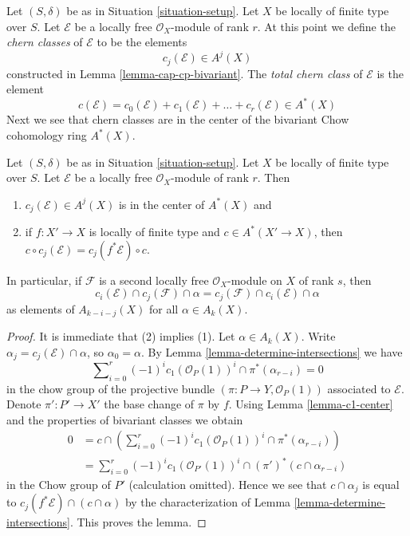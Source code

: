 \noindent
Let $(S, \delta)$ be as in Situation \ref{situation-setup}.
Let $X$ be locally of finite type over $S$.
Let $\mathcal{E}$ be a locally free $\mathcal{O}_X$-module
of rank $r$. At this point we define the {\it chern classes}
of $\mathcal{E}$ to be the elements
$$
c_j(\mathcal{E}) \in A^j(X)
$$
constructed in Lemma \ref{lemma-cap-cp-bivariant}. The
{\it total chern class} of $\mathcal{E}$ is the element
$$
c(\mathcal{E}) = 
c_0(\mathcal{E}) + c_1(\mathcal{E}) + \ldots + c_r(\mathcal{E})
\in A^*(X)
$$
Next we see that chern classes are in the center of the bivariant
Chow cohomology ring $A^*(X)$.

\begin{lemma}
\label{lemma-cap-commutative-chern}
Let $(S, \delta)$ be as in Situation \ref{situation-setup}.
Let $X$ be locally of finite type over $S$.
Let $\mathcal{E}$ be a locally free $\mathcal{O}_X$-module of rank $r$.
Then
\begin{enumerate}
\item $c_j(\mathcal{E}) \in A^j(X)$ is in the center of $A^*(X)$ and
\item if $f : X' \to X$ is locally of finite type and $c \in A^*(X' \to X)$,
then $c \circ c_j(\mathcal{E}) = c_j(f^*\mathcal{E}) \circ c$.
\end{enumerate}
In particular, if $\mathcal{F}$ is a second locally free
$\mathcal{O}_X$-module on $X$ of rank $s$, then
$$
c_i(\mathcal{E}) \cap c_j(\mathcal{F}) \cap \alpha
=
c_j(\mathcal{F}) \cap c_i(\mathcal{E}) \cap \alpha
$$
as elements of $A_{k - i - j}(X)$ for all $\alpha \in A_k(X)$.
\end{lemma}

\begin{proof}
It is immediate that (2) implies (1).
Let $\alpha \in A_k(X)$. Write $\alpha_j = c_j(\mathcal{E}) \cap \alpha$, so
$\alpha_0 = \alpha$. By Lemma \ref{lemma-determine-intersections} we have
$$
\sum\nolimits_{i = 0}^r
(-1)^i c_1(\mathcal{O}_P(1))^i \cap
\pi^*(\alpha_{r - i}) = 0
$$
in the chow group of the projective bundle
$(\pi : P \to Y, \mathcal{O}_P(1))$
associated to $\mathcal{E}$. Denote $\pi' : P' \to X'$ the base change
of $\pi$ by $f$. Using Lemma \ref{lemma-c1-center} and
the properties of bivariant classes we obtain
\begin{align*}
0 & = c \cap \left(\sum\nolimits_{i = 0}^r
(-1)^i c_1(\mathcal{O}_P(1))^i \cap
\pi^*(\alpha_{r - i})\right) \\
& =
\sum\nolimits_{i = 0}^r
(-1)^i c_1(\mathcal{O}_{P'}(1))^i \cap
(\pi')^*(c \cap \alpha_{r - i})
\end{align*}
in the Chow group of $P'$ (calculation omitted).
Hence we see that $c \cap \alpha_j$ is
equal to $c_j(f^*\mathcal{E}) \cap (c \cap \alpha)$ by the characterization
of Lemma \ref{lemma-determine-intersections}.
This proves the lemma.
\end{proof}

